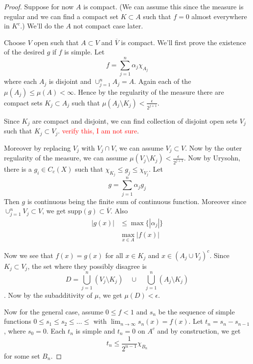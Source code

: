 \begin{proof}
  Suppose for now $A$ is compact. (We can assume this since the
    measure is regular and we can find a compact set $K \subset A$ such
  that $f = 0$ almost everywhere in $K^c$.) We'll do the $A$ not
  compact case later.

  Choose $V$ open such that $ A \subset V$ and $\overline{V}$ is
  compact. We'll first prove the existence of the desired $g$ if $f$
  is simple. Let \[
    f = \sum_{j = 1}^{n} \alpha_j \chi_{A_j}
  \]
  where each $A_j$ is disjoint and $\cup_{j = 1}^{n}A_j = A$. Again
  each of the $\mu(A_j) \le \mu(A) < \infty$. Hence by the regularity
  of the measure there are compact sets $K_j \subset A_j$ such that $
  \mu(A_j \setminus K_j) < \frac{\epsilon}{2^{j+1}}$.

  Since $K_j$ are compact and disjoint, we can find collection of
  disjoint open sets $V_j$ such that $K_j \subset V_j$.
  \textcolor{red}{verify this, I am not sure}.

  Moreover by replacing $V_j$ with $V_j \cap V$, we can assume $V_j \subset V$.
  Now by the outer regularity of the measure, we can assume $\mu(V_j
  \setminus K_j) < \frac{\epsilon}{2^{j+1}}$. Now by Urysohn, there is a
  $g_i \in C_c(X)$ such that $\chi_{K_j} \le g_j \le \chi_{V_j}$. Let   \[
    g = \sum_{j = 1}^{n} \alpha_j g_j
  \]
  Then $g$ is continuous being the finite sum of continuous function.
  Moreover since $\cup_{j = 1}^{n}V_j \subset V$, we get
  $\textrm{supp}(g) \subset \overline{V}$. Also
  \begin{align*}
    |g(x)| & \le \max \{ |\alpha_j| \} \\
    & \max_{x \in A} | f(x)|
  \end{align*}

  Now we see that $f(x) = g(x)$ for all $x \in K_j$ and $x \in
  (A_j \cup V_j)^c$. Since $K_j \subset V_j$, the set where they possibly
  disagree is $$D = \bigcup_{j = 1}^{n}(V_j \setminus K_j) \quad \cup
  \quad \bigcup_{j = 1}^{n}(A_j \setminus K_j)$$.
  Now by the subadditivity of $\mu$, we get $\mu(D) < \epsilon$.

  Now for the general case, assume $0\le f < 1$ and $s_n$ be the
  sequence of simple functions $0 \le s_1 \le s_2 \le \ldots \le $
  with $\lim_{n \to \infty} s_n(x) = f(x)$. Let $t_n = s_n -
  s_{n-1}$, where $s_0 = 0$. Each $t_n$ is simple and $t_n = 0$ on
  $A^c$ and by construction, we get \[
    t_n \le \frac{1}{2^{n-1}} \chi_{B_n}
  \]
  for some  set $B_n$.


\end{proof}

